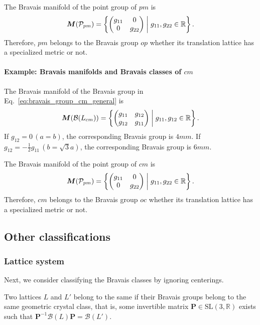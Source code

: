 The Bravais manifold of the point group of $pm$ is
\begin{align*}
  \bm{M}(\mathcal{P}_{pm}) = \left\{ 
    \begin{pmatrix} g_{11} & 0 \\ 0 & g_{22} \end{pmatrix}
   \mathrel{}\middle|\mathrel{} 
    g_{11}, g_{22} \in \mathbb{R}
   \right\}.
\end{align*}
Therefore, $pm$ belongs to the Bravais group $op$ whether its translation lattice has a specialized metric or not.

\paragraph{Example: Bravais manifolds and Bravais classes of $cm$}

The Bravais manifold of the Bravais group in Eq.~\eqref{eq:bravais_group_cm_general} is
\begin{align*}
  \bm{M}(\mathcal{B}(L_{cm})) = \left\{ 
    \begin{pmatrix} g_{11} & g_{12} \\ g_{12} & g_{11} \end{pmatrix}
   \mathrel{}\middle|\mathrel{} 
    g_{11}, g_{12} \in \mathbb{R}
   \right\}.
\end{align*}
If $g_{12} = 0 \, (a = b)$, the corresponding Bravais group is $4mm$.
If $g_{12} = -\frac{1}{2} g_{11} \, (b = \sqrt{3} a)$, the corresponding Bravais group is $6mm$.

The Bravais manifold of the point group of $cm$ is
\begin{align*}
  \bm{M}(\mathcal{P}_{pm}) = \left\{ 
    \begin{pmatrix} g_{11} & 0 \\ 0 & g_{22} \end{pmatrix}
   \mathrel{}\middle|\mathrel{} 
    g_{11}, g_{22} \in \mathbb{R}
   \right\}.
\end{align*}
Therefore, $cm$ belongs to the Bravais group $oc$ whether its translation lattice has a specialized metric or not.

\subsection{Other classifications}

\subsubsection{\label{sec:lattice-system}Lattice system}

Next, we consider classifying the Bravais classes by ignoring centerings.
\begin{screen}
  \begin{defn}
    Two lattices $L$ and $L'$ belong to the same  if their Bravais groups belong to the same geometric crystal class, that is, some invertible matrix $\bm{P} \in \mathrm{SL}(3, \mathbb{R})$ exists such that $\bm{P}^{-1} \mathcal{B}(L) \bm{P} = \mathcal{B}(L')$.
  \end{defn}
\end{screen}


